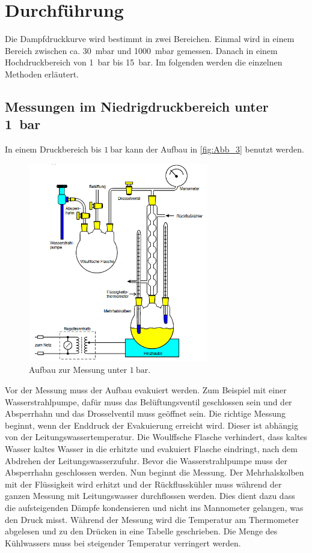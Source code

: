 \section{Durchführung}
\label{sec:Durchführung}

Die Dampfdruckkurve wird bestimmt in zwei Bereichen.
Einmal wird in einem Bereich zwischen ca. \qty{30}{\milli\bar} und \qty{1000}{\milli\bar} gemessen.
Danach in einem Hochdruckbereich von \qty{1}{\bar} bis \qty{15}{\bar}.
Im folgenden werden die einzelnen Methoden erläutert.

\subsection{Messungen im Niedrigdruckbereich unter \qty{1}{\bar}} %
\label{sub:M_Niedrigdruckbereich}
In einem Druckbereich bis $\qty{1}{\bar}$ kann der Aufbau in \autoref{fig:Abb_3} benutzt werden.
\begin{figure}[H]
    \centering
    \includegraphics[width=0.7\textwidth]{build/Abb_3.PNG}
    \caption {Aufbau zur Messung unter $\qty{1}{\bar}$.\cite{v203}}
    \label{fig:Abb_3}
\end{figure}
Vor der Messung muss der Aufbau evakuiert werden.
Zum Beispiel mit einer Wasserstrahlpumpe, dafür muss das Belüftungsventil geschlossen sein und der Absperrhahn und das Drosselventil muss geöffnet sein.
Die richtige Messung beginnt, wenn der Enddruck der Evakuierung erreicht wird.
Dieser ist abhängig von der Leitungswassertemperatur.
Die Woulffsche Flasche verhindert, dass kaltes Wasser kaltes Wasser in die erhitzte und evakuiert Flasche eindringt, nach dem Abdrehen der Leitungswasserzufuhr.
Bevor die Wasserstrahlpumpe muss der Absperrhahn geschlossen werden.
Nun beginnt die Messung.
Der Mehrhalskolben mit der Flüssigkeit wird erhitzt und der Rückflusskühler muss während der ganzen Messung mit Leitungswasser durchflossen werden.
Dies dient dazu dass die aufsteigenden Dämpfe kondensieren und nicht ins Mannometer gelangen, was den Druck misst.
Während der Messung wird die Temperatur am Thermometer abgelesen und zu den Drücken in eine Tabelle geschrieben.
Die Menge des Kühlwassers muss bei steigender Temperatur verringert werden.

